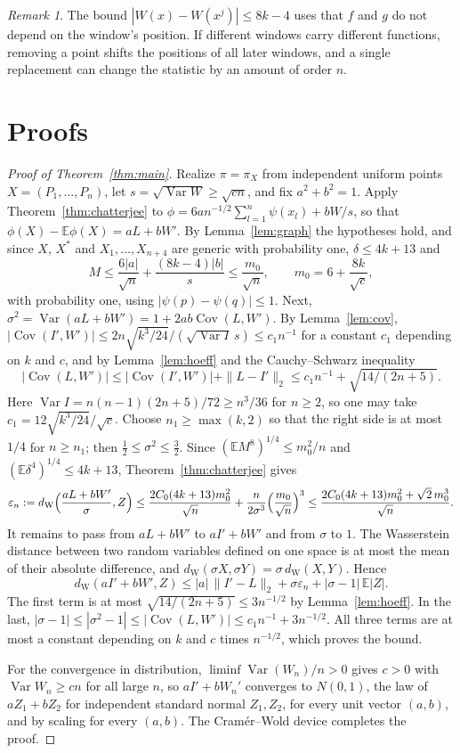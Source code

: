 \documentclass[11pt]{amsart}
\theoremstyle{remark}
\newtheorem{remark}[theorem]{Remark}
\newcommand{\E}{\mathbb{E}}
\newcommand{\Var}{\operatorname{Var}}
\newcommand{\Cov}{\operatorname{Cov}}
\newcommand{\dW}{d_{\mathrm W}}
\begin{document}
\begin{remark}
The bound $|W(x)-W(x^j)|\le8k-4$ uses that $f$ and $g$ do not depend on the window's position. If different windows
carry different functions, removing a point shifts the positions of all later windows, and a single replacement can
change the statistic by an amount of order $n$.
\end{remark}

\section{Proofs}\label{sec:proofs}

\begin{proof}[Proof of Theorem~\ref{thm:main}]
Realize $\pi=\pi_X$ from independent uniform points $X=(P_1,\dots,P_n)$, let $s=\sqrt{\Var W}\ge\sqrt{cn}$, and fix
$a^2+b^2=1$. Apply Theorem~\ref{thm:chatterjee} to $\phi=6an^{-1/2}\sum_{l=1}^n\psi(x_l)+bW/s$, so that $\phi(X)-\E\phi(X)=aL+bW'$.
By Lemma~\ref{lem:graph} the hypotheses hold, and since $X$, $X^*$ and $X_1,\dots,X_{n+4}$ are generic with
probability one, $\delta\le4k+13$ and
\[
M\le\frac{6|a|}{\sqrt n}+\frac{(8k-4)|b|}{s}\le\frac{m_0}{\sqrt n},\qquad m_0=6+\frac{8k}{\sqrt c},
\]
with probability one, using $|\psi(p)-\psi(q)|\le1$. Next, $\sigma^2=\Var(aL+bW')=1+2ab\Cov(L,W')$. By Lemma~\ref{lem:cov},
$|\Cov(I',W')|\le2n\sqrt{k^3/24}/(\sqrt{\Var I}\,s)\le c_1n^{-1}$ for a constant $c_1$ depending on $k$ and $c$, and
by Lemma~\ref{lem:hoeff} and the Cauchy--Schwarz inequality
\[
|\Cov(L,W')|\le|\Cov(I',W')|+\|L-I'\|_2\le c_1n^{-1}+\sqrt{14/(2n+5)}.
\]
Here $\Var I=n(n-1)(2n+5)/72\ge n^3/36$ for $n\ge2$, so one may take $c_1=12\sqrt{k^3/24}/\sqrt c$. Choose
$n_1\ge\max(k,2)$ so that the right side is at most $1/4$ for $n\ge n_1$; then $\tfrac12\le\sigma^2\le\tfrac32$. Since
$(\E M^8)^{1/4}\le m_0^2/n$ and $(\E\delta^4)^{1/4}\le4k+13$, Theorem~\ref{thm:chatterjee} gives
\[
\varepsilon_n:=\dW\Bigl(\frac{aL+bW'}{\sigma},Z\Bigr)\le\frac{2C_0(4k+13)m_0^2}{\sqrt n}+\frac{n}{2\sigma^3}\Bigl(\frac{m_0}{\sqrt n}\Bigr)^3
\le\frac{2C_0(4k+13)m_0^2+\sqrt2\,m_0^3}{\sqrt n}.
\]
It remains to pass from $aL+bW'$ to $aI'+bW'$ and from $\sigma$ to $1$. The Wasserstein distance between two random
variables defined on one space is at most the mean of their absolute difference, and
$\dW(\sigma X,\sigma Y)=\sigma\,\dW(X,Y)$. Hence
\[
\dW(aI'+bW',Z)\le|a|\,\|I'-L\|_2+\sigma\varepsilon_n+|\sigma-1|\,\E|Z|.
\]
The first term is at most $\sqrt{14/(2n+5)}\le3n^{-1/2}$ by Lemma~\ref{lem:hoeff}. In the last,
$|\sigma-1|\le|\sigma^2-1|\le|\Cov(L,W')|\le c_1n^{-1}+3n^{-1/2}$. All three terms are at most a constant depending
on $k$ and $c$ times $n^{-1/2}$, which proves the bound.

For the convergence in distribution, $\liminf\Var(W_n)/n>0$ gives $c>0$ with $\Var W_n\ge cn$ for all large $n$, so
$aI'+bW_n'$ converges to $N(0,1)$, the law of $aZ_1+bZ_2$ for independent standard normal $Z_1,Z_2$, for every unit
vector $(a,b)$, and by scaling for every $(a,b)$. The Cramér--Wold device completes the proof.
\end{proof}
\end{document}
